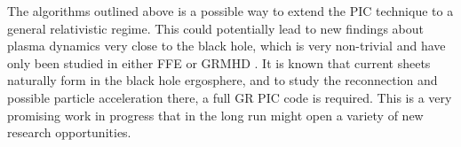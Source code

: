 The algorithms outlined above is a possible way to extend the PIC technique to a
general relativistic regime. This could potentially lead to new findings about
plasma dynamics very close to the black hole, which is very non-trivial and have
only been studied in either FFE or GRMHD
\citep[e.g.][]{komissarov_electrodynamics_2004}. It is known that current sheets
naturally form in the black hole ergosphere, and to study the reconnection and
possible particle acceleration there, a full GR PIC code is required. This is a
very promising work in progress that in the long run might open a variety of new
research opportunities.


